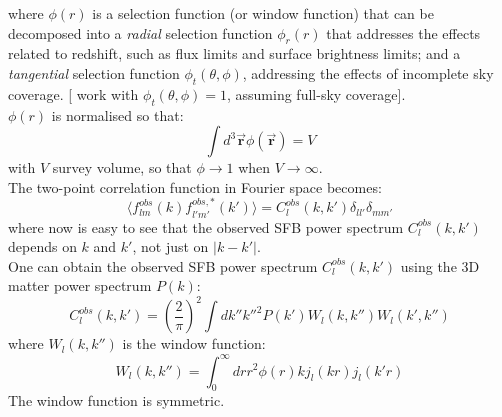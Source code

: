 where $\phi(r)$ is a selection function (or window function) that can be decomposed into a \textit{radial} selection function $\phi_r(r)$ that addresses the effects related to redshift, such as flux limits and surface brightness limits; and a \textit{tangential} selection function $\phi_t(\theta,\phi)$, addressing the effects of incomplete sky coverage. [\cite{Rassat_Refregier_2012} work with $\phi_t(\theta,\phi) = 1$, assuming full-sky coverage]. \\
$\phi(r)$ is normalised so that:
\begin{equation}
\label{eq19_sfb_bao}
    \int d^3\vec{\mathbf{r}} \phi(\vec{\mathbf{r}}) = V
\end{equation}
with $V$ survey volume, so that $\phi \to 1$ when $V \to \infty$. \\
The two-point correlation function in Fourier space becomes:
\begin{equation}
\label{eq11_sfb_bao}
\langle f^{obs}_{lm}(k) f^{obs, *}_{l'm'}(k')\rangle = C^{obs}_l(k,k') \delta_{ll'}\delta_{mm'}
\end{equation}
where now is easy to see that the observed SFB power spectrum $C^{obs}_l(k,k')$ depends on $k$ and $k'$, not just on $|k-k'|$. \\
One can obtain the observed SFB power spectrum $C^{obs}_l(k,k')$ using the 3D matter power spectrum $P(k)$:
\begin{equation}
\label{eq12_sfb_bao}
    C^{obs}_l(k,k') = (\frac{2}{\pi})^2 \int dk'' k''^2 P(k')W_l(k,k'')W_l(k',k'')
\end{equation}
where $W_l(k,k'')$ is the window function:
\begin{equation}
    W_l(k,k'') = \int_{0}^{\infty} dr r^2 \phi(r) k j_l(kr) j_l(k'r)
\end{equation}
The window function is symmetric. 